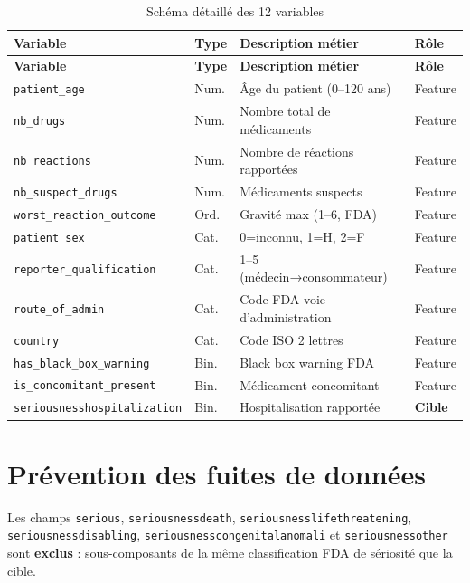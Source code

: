 \documentclass[11pt,a4paper,twoside,openright]{report}
\begin{document}
\begin{longtable}{p{3.8cm}p{1.2cm}p{5.5cm}p{1.5cm}}
  \caption{Schéma détaillé des 12 variables} \label{tab:schema} \\
  \toprule
  \textbf{Variable} & \textbf{Type} & \textbf{Description métier} & \textbf{Rôle} \\
  \midrule
  \endfirsthead
  \toprule
  \textbf{Variable} & \textbf{Type} & \textbf{Description métier} & \textbf{Rôle} \\
  \midrule
  \endhead
  \texttt{patient\_age} & Num. & Âge du patient (0–120 ans) & Feature \\
  \texttt{nb\_drugs} & Num. & Nombre total de médicaments & Feature \\
  \texttt{nb\_reactions} & Num. & Nombre de réactions rapportées & Feature \\
  \texttt{nb\_suspect\_drugs} & Num. & Médicaments suspects & Feature \\
  \texttt{worst\_reaction\_outcome} & Ord. & Gravité max (1–6, FDA) & Feature \\
  \texttt{patient\_sex} & Cat. & 0=inconnu, 1=H, 2=F & Feature \\
  \texttt{reporter\_qualification} & Cat. & 1–5 (médecin→consommateur) & Feature \\
  \texttt{route\_of\_admin} & Cat. & Code FDA voie d'administration & Feature \\
  \texttt{country} & Cat. & Code ISO 2 lettres & Feature \\
  \texttt{has\_black\_box\_warning} & Bin. & Black box warning FDA & Feature \\
  \texttt{is\_concomitant\_present} & Bin. & Médicament concomitant & Feature \\
  \texttt{seriousnesshospitalization} & Bin. & Hospitalisation rapportée & \textbf{Cible} \\
  \bottomrule
\end{longtable}

\section{Prévention des fuites de données}

Les champs \texttt{serious}, \texttt{seriousnessdeath}, \texttt{seriousnesslifethreatening}, \texttt{seriousnessdisabling}, \texttt{seriousnesscongenitalanomali} et \texttt{seriousnessother} sont \textbf{exclus} : sous-composants de la même classification FDA de sériosité que la cible.
\end{document}
